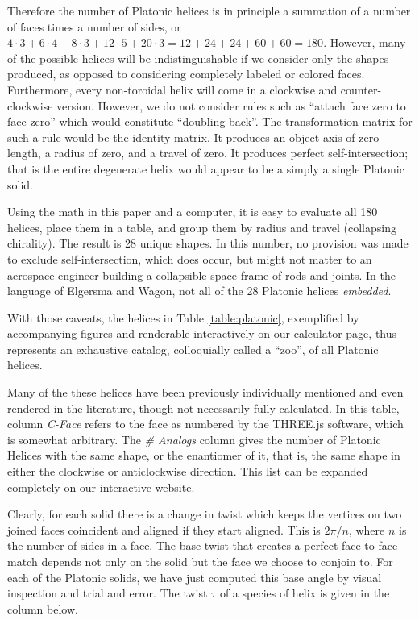 \documentclass[11pt]{article}
\begin{document}
{Therefore the number of Platonic helices is in principle a summation of a number of faces times a number of sides, or
$4 \cdot 3 + 6 \cdot 4 + 8 \cdot 3 + 12 \cdot 5 + 20 \cdot 3 = 12 + 24 + 24 + 60 + 60 = 180$.
However, many of the possible helices will be indistinguishable if we consider only the shapes produced, as
opposed to considering completely labeled or colored faces. Furthermore,
every non-toroidal helix will come in a clockwise and counter-clockwise version.
However, we do not consider rules such as ``attach face zero to face zero''
which would constitute
``doubling back''\cite{elgersma2016quadrahelix}.
The transformation matrix for such a rule would be the identity matrix.
It produces an object axis of zero length, a radius of zero, and
a travel of zero. It produces perfect self-intersection; that is the entire
degenerate helix would appear to be a simply a single Platonic solid.

Using the math in this paper and a computer, it is easy to evaluate all 180 helices,
place them in a table, and group them
by radius and travel (collapsing chirality).
The result is 28 unique shapes. In this number, no provision was made to exclude
self-intersection,
which does occur, but might not matter to
an aerospace engineer building a collapsible space frame of rods and joints.
In the language of Elgersma and Wagon\cite{elgersma2016quadrahelix}, not
all of the 28 Platonic helices {\em embedded}.

With those caveats, the helices in Table \ref{table:platonic}, exemplified by
accompanying figures and renderable
interactively on our calculator page, thus represents an exhaustive catalog,
colloquially called a ``zoo'', of all Platonic helices.

Many of the these helices have been previously individually
mentioned and even rendered in the literature,
though not necessarily fully calculated.
In this table, column {\em C-Face} refers to the
face as numbered by the THREE.js software\cite{dirksen2013learning},
which is somewhat arbitrary. The {\em \# Analogs}
column gives the number of Platonic Helices with the same shape, or the enantiomer of it,
that is, the same
shape in either the clockwise or anticlockwise direction.
This list can be expanded completely on our interactive website.

Clearly, for each solid there is a change in twist which keeps the vertices on
two joined faces coincident and
aligned if they start aligned. This is $2\pi/n$,
where $n$ is the number of sides in a face. The base twist that creates
a perfect face-to-face match depends not only on the solid but the face we choose to conjoin to.
For each of the Platonic
solids, we have just computed this base angle by visual inspection and trial and error.
The twist $\tau$ of a species
of helix is given in the column below.

}
\end{document}
